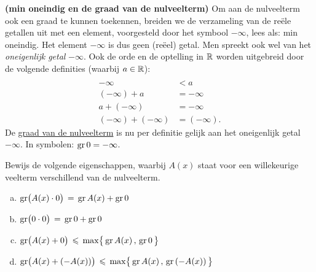 \documentclass{ximera}
\begin{document}
\begin{Uitbreiding}
\begin{exercise} 
\label{oefgraadnulveelterm}
{\bf (min oneindig en de graad van de nulveelterm)} 
Om aan de nulveelterm ook een graad te kunnen toekennen, breiden we de verzameling van de re\"ele getallen uit met een element, voorgesteld door het symbool $- \infty$, lees als: min oneindig. Het element $-\infty$ is dus geen (re\"eel) getal. Men spreekt ook wel van het {\em oneigenlijk getal} $-\infty$. Ook de orde en de optelling in $\mathbb{R}$ worden uitgebreid door de volgende definities (waarbij $a \in \mathbb{R}$):
\[
\begin{aligned}
\\[-0.5cm]
-\infty & < a \\
(-\infty) + a & = -\infty \\
a + (-\infty) & = -\infty \\
(-\infty) + (-\infty) & = (-\infty).
\end{aligned}
\]
De \underline{graad van de nulveelterm} is nu per definitie gelijk aan het oneigenlijk getal $-\infty$. In symbolen: $\operatorname{gr} 0 = - \infty$.

Bewijs de volgende eigenschappen, waarbij $A(x)$ staat voor een willekeurige veelterm verschillend van de nulveelterm.
\begin{enumerate}[(a)]
\item
$\operatorname{gr}\bigl( A(x) \cdot 0 \bigr) \, = \, \operatorname{gr} A(x) + \operatorname{gr} 0$
\item
$\operatorname{gr}\bigl( 0 \cdot 0 \bigr) \, = \, \operatorname{gr} 0 + \operatorname{gr} 0$
\item
$\displaystyle \operatorname{gr}\bigl( A(x) + 0 \bigr) \, \leqslant \, \max \bigl\{ \,\operatorname{gr} A(x)\, , \, \operatorname{gr} 0 \, \bigr\}$
\item
$\displaystyle \operatorname{gr}\bigl( A(x) + (-A(x)) \bigr) \, \leqslant \, \max \bigl\{ \,\operatorname{gr} A(x)\, , \, \operatorname{gr} \left(-A(x)\right) \, \bigr\}$
\end{enumerate}
\end{exercise} 
\end{Uitbreiding}
\end{document}
